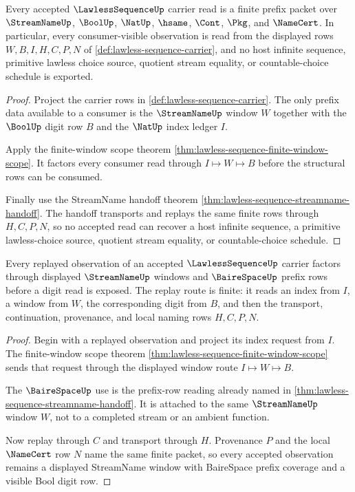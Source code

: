 \begin{theorem}
\label{thm:lawless-sequence-choice-free-carrier-obligation}
Every accepted $\LawlessSequenceUp$ carrier read is a finite prefix packet over $\StreamNameUp$, $\BoolUp$, $\NatUp$, $\hsame$, $\Cont$, $\Pkg$, and $\NameCert$. In particular, every consumer-visible observation is read from the displayed rows $W,B,I,H,C,P,N$ of \autoref{def:lawless-sequence-carrier}, and no host infinite sequence, primitive lawless choice source, quotient stream equality, or countable-choice schedule is exported.
\end{theorem}
\begin{proof}
Project the carrier rows in \autoref{def:lawless-sequence-carrier}. The only prefix data available to a consumer is the $\StreamNameUp$ window $W$ together with the $\BoolUp$ digit row $B$ and the $\NatUp$ index ledger $I$.

Apply the finite-window scope theorem \autoref{thm:lawless-sequence-finite-window-scope}. It factors every consumer read through $I\longmapsto W\longmapsto B$ before the structural rows can be consumed.

Finally use the StreamName handoff theorem \autoref{thm:lawless-sequence-streamname-handoff}. The handoff transports and replays the same finite rows through $H,C,P,N$, so no accepted read can recover a host infinite sequence, a primitive lawless-choice source, quotient stream equality, or countable-choice schedule.
\end{proof}

\begin{theorem}
\label{thm:lawless-sequence-streamname-window-obligation}
Every replayed observation of an accepted $\LawlessSequenceUp$ carrier factors through displayed $\StreamNameUp$ windows and $\BaireSpaceUp$ prefix rows before a digit read is exposed. The replay route is finite: it reads an index from $I$, a window from $W$, the corresponding digit from $B$, and then the transport, continuation, provenance, and local naming rows $H,C,P,N$.
\end{theorem}
\begin{proof}
Begin with a replayed observation and project its index request from $I$. The finite-window scope theorem \autoref{thm:lawless-sequence-finite-window-scope} sends that request through the displayed window route $I\longmapsto W\longmapsto B$.

The $\BaireSpaceUp$ use is the prefix-row reading already named in \autoref{thm:lawless-sequence-streamname-handoff}. It is attached to the same $\StreamNameUp$ window $W$, not to a completed stream or an ambient function.

Now replay through $C$ and transport through $H$. Provenance $P$ and the local $\NameCert$ row $N$ name the same finite packet, so every accepted observation remains a displayed StreamName window with BaireSpace prefix coverage and a visible Bool digit row.
\end{proof}

